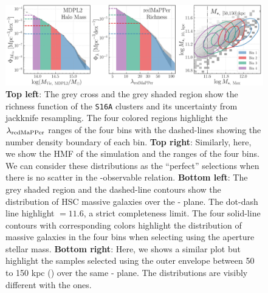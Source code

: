 \documentclass[fleqn,usenatbib,useAMS,english]{mnras}
\begin{document}
    \begin{figure}
        \centering
        \includegraphics[width=\textwidth]{figure/topn_fig_4}
        \caption{
            \textbf{Top left}:
            The grey cross and the grey shaded region show the richness function of the
            \texttt{S16A} \redm{} clusters and its uncertainty from jackknife resampling.
            The four colored regions highlight the $\lambda_{\rm redMaPPer}$ ranges of the four
            \topn{} bins with the dashed-lines showing the number density boundary of each bin.
            \textbf{Top right}:
            Similarly, here, we show the HMF of the  simulation and the \mhalo{} ranges
            of the four \topn{} bins.
            We can consider these \mhalo{} distributions as the ``perfect'' \topn{} selections
            when there is no scatter in the \mhalo{}-observable relation.
            \textbf{Bottom left}:
            The grey shaded region and the dashed-line contours show the distribution of HSC
            massive galaxies over the \mmax{}-\minn{} plane.
            The dot-dash line highlight \logmmax{}$=11.6$, a strict \mmax{} completeness
            limit.
            The four solid-line contours with corresponding colors highlight the distribution
            of massive galaxies in the four \topn{} bins when selecting using the 
            aperture stellar mass.
            \textbf{Bottom right}:
            Here, we shows a similar plot but highlight the \topn{} samples selected using
            the outer envelope \mstar{} between 50 to 150 kpc () over the
            same \mmax{}-\minn{} plane.
            The distributions are visibly different with the  ones.}
        \label{fig:density_bins}
    \end{figure}
\end{document}
